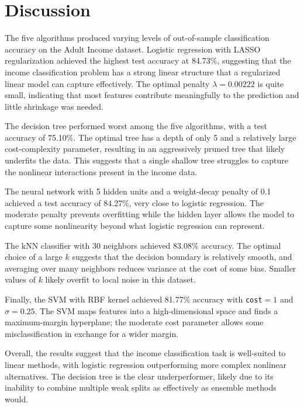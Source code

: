 \documentclass[12pt]{article}
\begin{document}
\section*{Discussion}

The five algorithms produced varying levels of out-of-sample classification accuracy on the Adult Income dataset. Logistic regression with LASSO regularization achieved the highest test accuracy at 84.73\%, suggesting that the income classification problem has a strong linear structure that a regularized linear model can capture effectively. The optimal penalty $\lambda = 0.00222$ is quite small, indicating that most features contribute meaningfully to the prediction and little shrinkage was needed.

The decision tree performed worst among the five algorithms, with a test accuracy of 75.10\%. The optimal tree has a depth of only 5 and a relatively large cost-complexity parameter, resulting in an aggressively pruned tree that likely underfits the data. This suggests that a single shallow tree struggles to capture the nonlinear interactions present in the income data.

The neural network with 5 hidden units and a weight-decay penalty of 0.1 achieved a test accuracy of 84.27\%, very close to logistic regression. The moderate penalty prevents overfitting while the hidden layer allows the model to capture some nonlinearity beyond what logistic regression can represent.

The kNN classifier with 30 neighbors achieved 83.08\% accuracy. The optimal choice of a large $k$ suggests that the decision boundary is relatively smooth, and averaging over many neighbors reduces variance at the cost of some bias. Smaller values of $k$ likely overfit to local noise in this dataset.

Finally, the SVM with RBF kernel achieved 81.77\% accuracy with \texttt{cost}$=1$ and $\sigma=0.25$. The SVM maps features into a high-dimensional space and finds a maximum-margin hyperplane; the moderate cost parameter allows some misclassification in exchange for a wider margin.

Overall, the results suggest that the income classification task is well-suited to linear methods, with logistic regression outperforming more complex nonlinear alternatives. The decision tree is the clear underperformer, likely due to its inability to combine multiple weak splits as effectively as ensemble methods would.
\end{document}
